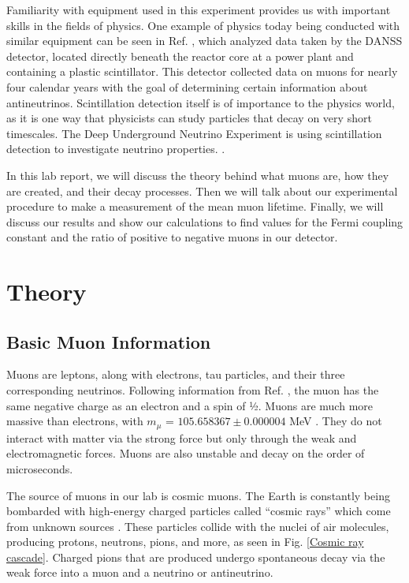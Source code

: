 \documentclass[11pt,letterpaper]{article}
\begin{document}
Familiarity with equipment used in this experiment provides us with important skills in the fields of physics. One example of physics today being conducted with similar equipment can be seen in Ref. \cite{Alekseev}, which analyzed data taken by the DANSS detector, located directly beneath the reactor core at a power plant and containing a plastic scintillator. This detector collected data on muons for nearly four calendar years with the goal of determining certain information about antineutrinos. Scintillation detection itself is of importance to the physics world, as it is one way that physicists can study particles that decay on very short timescales. The Deep Underground Neutrino Experiment is using scintillation detection to investigate neutrino properties. \cite{Gauch}.

In this lab report, we will discuss the theory behind what muons are, how they are created, and their decay processes. Then we will talk about our experimental procedure to make a measurement of the mean muon lifetime. Finally, we will discuss our results and show our calculations to find values for the Fermi coupling constant and the ratio of positive to negative muons in our detector.



\section{Theory}

\subsection{Basic Muon Information}

Muons are leptons, along with electrons, tau particles, and their three corresponding neutrinos. Following information from Ref. \cite{Frauenfelder}, the muon has the same negative charge as an electron and a spin of ½. Muons are much more massive than electrons, with $m_\mu$ = $105.658367 \pm 0.000004$ MeV \cite{Balantekin}. They do not interact with matter via the strong force but only through the weak and electromagnetic forces. Muons are also unstable and decay on the order of microseconds. 

The source of muons in our lab is cosmic muons. The Earth is constantly being bombarded with high-energy charged particles called “cosmic rays” which come from unknown sources \cite{Coan}. These particles collide with the nuclei of air molecules, producing protons, neutrons, pions, and more, as seen in Fig. \ref{Cosmic ray cascade}. Charged pions that are produced undergo spontaneous decay via the weak force into a muon and a neutrino or antineutrino. 
\end{document}
